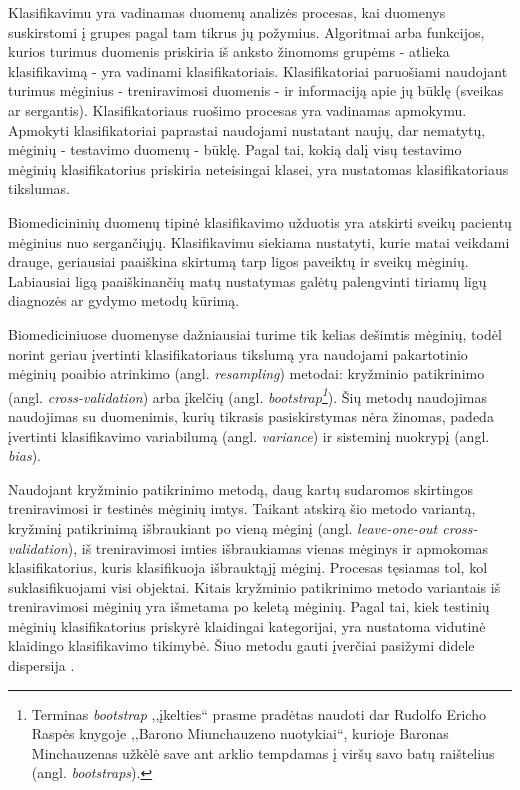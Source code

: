 Klasifikavimu\cite{fisher1936use} yra vadinamas duomenų analizės procesas, kai duomenys suskirstomi į grupes pagal tam tikrus jų požymius. Algoritmai arba funkcijos, kurios turimus duomenis priskiria iš anksto žinomoms grupėms - atlieka klasifikavimą - yra vadinami klasifikatoriais. Klasifikatoriai paruošiami naudojant turimus mėginius - treniravimosi duomenis - ir informaciją apie jų būklę (sveikas ar sergantis). Klasifikatoriaus ruošimo procesas yra vadinamas apmokymu. Apmokyti klasifikatoriai paprastai naudojami nustatant naujų, dar nematytų, mėginių - testavimo duomenų - būklę. Pagal tai, kokią dalį visų testavimo mėginių klasifikatorius priskiria neteisingai klasei, yra nustatomas klasifikatoriaus tikslumas. 

Biomedicininių duomenų tipinė klasifikavimo užduotis yra atskirti sveikų pacientų mėginius nuo sergančiųjų. Klasifikavimu siekiama nustatyti, kurie matai veikdami drauge, geriausiai paaiškina skirtumą tarp ligos paveiktų ir sveikų mėginių. Labiausiai ligą paaiškinančių matų nustatymas galėtų palengvinti tiriamų ligų diagnozės ar gydymo metodų kūrimą.

Biomediciniuose duomenyse dažniausiai turime tik kelias dešimtis mėginių, todėl norint geriau įvertinti klasifikatoriaus tikslumą yra naudojami pakartotinio mėginių poaibio atrinkimo (angl. \textit{resampling}) metodai: kryžminio patikrinimo (angl. \textit{cross-validation}) arba įkelčių (angl. \textit{bootstrap\footnote{Terminas \textit{bootstrap} ,,įkelties`` prasme pradėtas naudoti dar Rudolfo Ericho Raspės knygoje ,,Barono Miunchauzeno nuotykiai``, kurioje Baronas Minchauzenas užkėlė save ant arklio tempdamas į viršų savo batų raištelius (angl. \textit{bootstraps}).}}). Šių metodų naudojimas naudojimas su duomenimis, kurių tikrasis pasiskirstymas nėra žinomas, padeda įvertinti klasifikavimo variabilumą (angl. \textit{variance}) ir sisteminį nuokrypį (angl. \textit{bias}).

Naudojant kryžminio patikrinimo metodą, daug kartų sudaromos skirtingos treniravimosi ir testinės mėginių imtys. Taikant atskirą šio metodo variantą, kryžminį patikrinimą išbraukiant po vieną mėginį (angl. \textit{leave-one-out cross-validation}), iš treniravimosi imties išbraukiamas vienas mėginys ir apmokomas klasifikatorius, kuris klasifikuoja išbrauktąjį mėginį. Procesas tęsiamas tol, kol suklasifikuojami visi objektai. Kitais kryžminio patikrinimo metodo variantais iš treniravimosi mėginių yra išmetama po keletą mėginių. Pagal tai, kiek testinių mėginių klasifikatorius priskyrė klaidingai kategorijai, yra nustatoma vidutinė klaidingo klasifikavimo tikimybė. Šiuo metodu gauti įverčiai pasižymi didele dispersija \cite{braga2004cross}.

